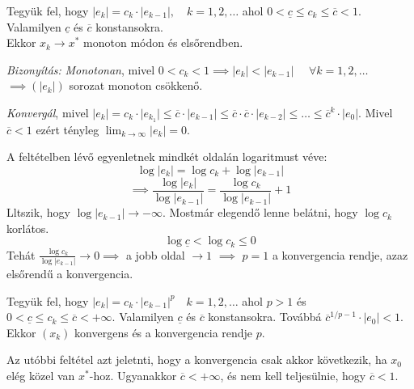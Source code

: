 \begin{allitas}
    Tegyük fel, hogy $\lvert e_{k} \rvert = c_{k} \cdot \lvert e_{k-1} \rvert, \quad k = 1, 2, \dots$ ahol $0 < \underline{c} \leq c_{k} \leq \overline{c} < 1$. Valamilyen $\underline{c}$ és $\overline{c}$ konstansokra. \\
    Ekkor $x_{k} \to x^{*}$ monoton módon és elsőrendben.
\end{allitas}

\textit{Bizonyítás:}
\textit{Monotonan}, mivel $0 < c_{k} < 1 \implies \lvert e_{k} \rvert < \lvert e_{k-1} \rvert$ $\quad \forall k = 1, 2, \dots$ $\implies (\lvert e_{k} \rvert)$ sorozat monoton csökkenő.

\textit{Konvergál}, mivel $\lvert e_{k} \rvert = c_{k} \cdot \lvert e_{k_{1}} \rvert \leq \overline c \cdot \lvert e_{k-1} \rvert \leq \overline c \cdot \overline c \cdot \lvert e_{k-2} \rvert \leq \dots \leq \overline c^{k} \cdot \lvert e_{0} \rvert$.  Mivel $\overline c < 1$ ezért tényleg $\lim_{ k \to \infty }\lvert e_{k} \rvert = 0$.

A feltételben lévő egyenletnek mindkét oldalán logaritmust véve:
\begin{equation*}
    \log \lvert e_{k} \rvert  = \log c_{k} + \log \lvert e_{k-1} \rvert 
\end{equation*}
\begin{equation*}
    \implies \frac{\log \lvert  e_{k} \rvert }{\log \lvert e_{k-1} \rvert } = \frac{\log c_{k}}{\log \lvert e_{k-1} \rvert } + 1
\end{equation*}
Lltszik, hogy $\log \lvert e_{k-1} \rvert \to - \infty$. Mostmár elegendő lenne belátni, hogy $\log c_{k}$ korlátos.
\begin{equation*}
    \log \underline c < \log c_{k} \leq 0
\end{equation*}
Tehát $\frac{\log c_{k}}{\log \lvert e_{k-1} \rvert } \to 0 \implies$ a jobb oldal $\to 1$ $\implies$ $p = 1$ a konvergencia rendje, azaz elsőrendű a konvergencia.

\begin{allitas}
    Tegyük fel, hogy $\lvert e_{k} \rvert = c_{k} \cdot \lvert e_{k-1} \rvert^{p} \quad k = 1, 2, \dots$ ahol $p > 1$ és $0 < \underline{c} \leq c_{k} \leq \overline c < + \infty$. Valamilyen $\underline{c}$ és $\overline c$ konstansokra. Továbbá $\overline{c}^{1/p-1} \cdot \lvert e_{0} \rvert < 1$. Ekkor $(x_{k})$ konvergens és a konvergencia rendje $p$.
\end{allitas}

\begin{megj}
    Az utóbbi feltétel azt jeletnti, hogy a konvergencia csak akkor következik, ha $x_{0}$ elég közel van $x^{*}$-hoz. Ugyanakkor $\overline c < + \infty$, és nem kell teljesülnie, hogy $\overline c < 1$.
\end{megj}

